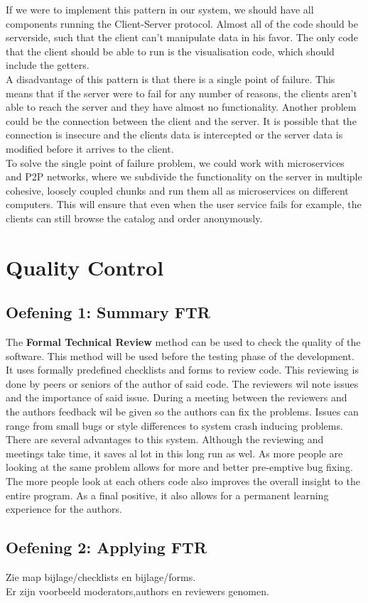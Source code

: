 \documentclass{article}
\begin{document}
If we were to implement this pattern in our system, we should have all components running the Client-Server protocol. Almost all of the code should be serverside, such that the client can't manipulate data in his favor. The only code that the client should be able to run is the visualisation code, which should include the getters. \\

A disadvantage of this pattern is that there is a single point of failure. This means that if the server were to fail for any number of reasons, the clients aren't able to reach the server and  they have almost no functionality. Another problem could be the connection between the client and the server. It is possible that the connection is insecure and the clients data is intercepted or the server data is modified before it arrives to the client. \\

To solve the single point of failure problem, we could work with microservices and P2P networks, where we subdivide the functionality on the server in multiple cohesive, loosely coupled chunks and run them all as microservices on different computers. This will ensure that even when the user service fails for example, the clients can still browse the catalog and order anonymously.\\

\section{Quality Control}

\subsection{Oefening 1: Summary FTR}
The \textbf{Formal Technical Review} method can be used to check the quality of the software. This method will be used before the testing phase of the development. It uses formally predefined checklists and forms to review code. This reviewing is done by peers or seniors of the author of said code. The reviewers wil note issues and the importance of said issue. During a meeting between the reviewers and the authors feedback wil be given so the authors can fix the problems. Issues can range from small bugs or style differences to system crash inducing problems.\\
There are several advantages to this system. Although the reviewing and meetings take time, it saves al lot in this long run as wel. As more people are looking at the same problem allows for more and better pre-emptive bug fixing. The more people look at each others code also improves the overall insight to the entire program. As a final positive, it also allows for a permanent learning experience for the authors. 

\subsection{Oefening 2: Applying FTR}
Zie map bijlage/checklists en bijlage/forms.\\
Er zijn voorbeeld moderators,authors en reviewers genomen.
\end{document}
